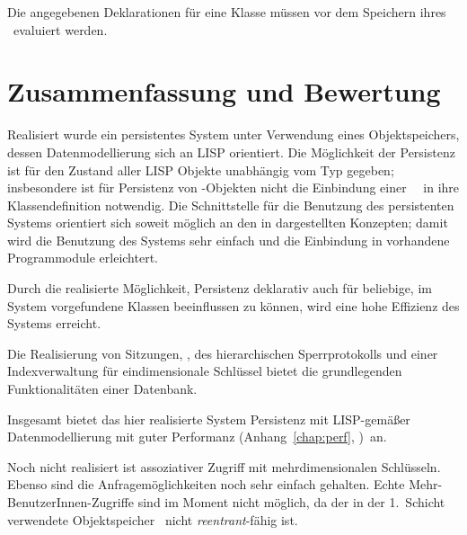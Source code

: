 Die angegebenen Deklarationen f\"{u}r eine Klasse m\"{u}ssen vor dem
Speichern ihres \clsdo[es]\ evaluiert werden.
\iffalse
Weiter Beispiele von
Deklarationen f\"{u}r systeminterne \lw\ Klassen befinden sich im Modul
\lisp{lisp-works}; das Modul \lisp{plob-obvius}\ enth\"{a}lt
Deklarationen, die es erm\"{o}glichen, Objekte des bildverarbeitenden
Systems {\sc Obvius} persistent zu halten.
\fi
%
\ifbericht%
\def\nextstep{\relax}%
\else%
\def\nextstep{%
\let\pfsection\section%
\let\pfsubsection\subsection%
\let\pfsubsubsection\subsubsection%
}%
\fi%
\nextstep%
%
\section{Zusammenfassung und Bewertung}%
\label{sec:plsac}%
%
Realisiert wurde ein persistentes System unter Verwendung eines
Objektspeichers, dessen Datenmodellierung sich an LISP orientiert.
Die M\"{o}glichkeit der Persistenz ist f\"{u}r den Zustand aller LISP
Objekte un\-ab\-h\"{a}n\-gig vom Typ gegeben; insbesondere ist f\"{u}r
Persistenz von \clos-Objekten nicht die Einbindung einer
\spc[n]\ \clsmc\ in ihre Klassendefinition notwendig. Die
Schnittstelle f\"{u}r die Benutzung des persistenten Systems orientiert
sich soweit m\"{o}glich an den in \cite{bib:st90} dargestellten
Konzepten; damit wird die Benutzung des Systems sehr einfach und die
Einbindung in vorhandene Programmodule erleichtert.
%
\par{}Durch die realisierte M\"{o}glichkeit, Persistenz deklarativ auch
f\"{u}r beliebige, im System vorgefundene Klassen beeinflussen zu
k\"{o}nnen, wird eine hohe Effizienz des Systems erreicht.
%
\par{}Die Realisierung von Sitzungen, \twophasetrs,
des hierarchischen Sperrprotokolls und einer Indexverwaltung f\"{u}r
eindimensionale Schl\"{u}ssel bietet die grundlegenden
Funktionalit\"{a}ten einer Datenbank.
%
\par{}Insgesamt bietet das hier realisierte System Persistenz mit
LISP-gem\"{a}\ss{}er Datenmodellierung mit guter Performanz
\ifbericht(Anhang~\ref{chap:perf},
\citepage{\pageref{chap:perf}})\fi\ an.
%
\par{}Noch nicht realisiert ist assoziativer Zugriff mit
mehrdimensionalen Schl\"{u}sseln. Ebenso sind die Anfragem\"{o}glichkeiten
noch sehr einfach gehalten. Echte Mehr-BenutzerInnen-Zugriffe sind
im Moment nicht m\"{o}glich, da der in der 1.~Schicht verwendete
Objektspeicher \postore\ nicht {\em reentrant\/}-f\"{a}hig ist.
